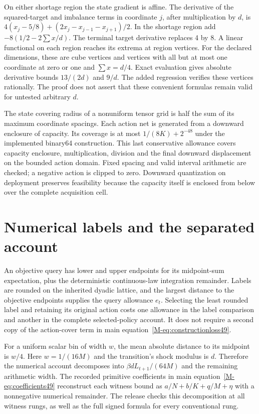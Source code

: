\documentclass[ecta,nameyear,draft]{econsocart}
\begin{document}
On either shortage region the state gradient is affine. The derivative of the squared-target and imbalance terms in coordinate $j$, after multiplication by $d$, is $4(x_j-5/8)+(2x_j-x_{j-1}-x_{j+1})/2$. In the shortage region add $-8(1/2-2\sum x/d)$. The terminal target derivative replaces 4 by 8. A linear functional on each region reaches its extrema at region vertices. For the declared dimensions, these are cube vertices and vertices with all but at most one coordinate at zero or one and $\sum x=d/4$. Exact evaluation gives absolute derivative bounds $13/(2d)$ and $9/d$. The added regression verifies these vertices rationally. The proof does not assert that these convenient formulas remain valid for untested arbitrary $d$.

The state covering radius of a nonuniform tensor grid is half the sum of its maximum coordinate spacings. Each action net is generated from a downward enclosure of capacity. Its coverage is at most $1/(8K)+2^{-48}$ under the implemented binary64 construction. This last conservative allowance covers capacity enclosure, multiplication, division and the final downward displacement on the bounded action domain. Fixed spacing and valid interval arithmetic are checked; a negative action is clipped to zero. Downward quantization on deployment preserves feasibility because the capacity itself is enclosed from below over the complete acquisition cell.

\section{Numerical labels and the separated account}\label{supp:numerical49}
An objective query has lower and upper endpoints for its midpoint-sum expectation, plus the deterministic continuous-law integration remainder. Labels are rounded on the inherited dyadic lattice, and the largest distance to the objective endpoints supplies the query allowance $e_t$. Selecting the least rounded label and retaining its original action costs one allowance in the label comparison and another in the complete selected-policy account. It does not require a second copy of the action-cover term in main equation~\eqref{M-eq:constructionloss49}.

For a uniform scalar bin of width $w$, the mean absolute distance to its midpoint is $w/4$. Here $w=1/(16M)$ and the transition's shock modulus is $d$. Therefore the numerical account decomposes into $\beta dL_{t+1}/(64M)$ and the remaining arithmetic width. The recorded primitive coefficients in main equation~\eqref{M-eq:coefficients49} reconstruct each witness bound as $a/N+b/K+q/M+\eta$ with a nonnegative numerical remainder. The release checks this decomposition at all witness rungs, as well as the full signed formula for every conventional rung.
\end{document}
